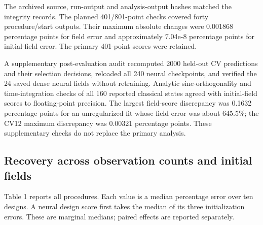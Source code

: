\documentclass[10pt,a4paper]{article}
\begin{document}
The archived source, run-output and analysis-output hashes matched the integrity
records. The planned 401/801-point checks covered forty procedure/start outputs.
Their maximum absolute changes were 0.001868 percentage points for field error
and approximately 7.04e-8 percentage points for initial-field error. The primary
401-point scores were retained.

A supplementary post-evaluation audit recomputed 2000 held-out CV predictions
and their selection decisions, reloaded all 240 neural checkpoints, and verified
the 24 saved dense neural fields without retraining. Analytic sine-orthogonality
and time-integration checks of all 160 reported classical states agreed with
initial-field scores to floating-point precision. The largest field-score
discrepancy was 0.1632 percentage points for an unregularized fit whose field
error was about 645.5\%; the CV12 maximum discrepancy was 0.00321 percentage
points. These supplementary checks do not replace the primary analysis.

\subsection{Recovery across observation counts and initial fields}

Table 1 reports all procedures. Each value is a median percentage error over ten
designs. A neural design score first takes the median of its three initialization
errors. These are marginal medians; paired effects are reported separately.
\end{document}
